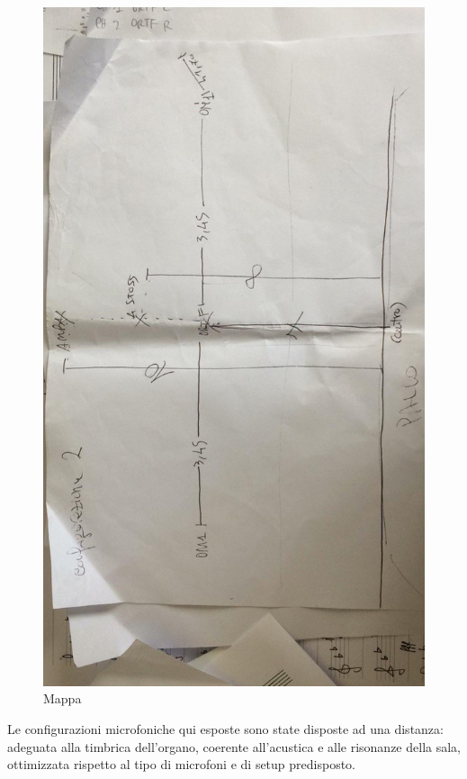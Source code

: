 \begin{figure}[th!]
\begin{center}
\includegraphics[angle=270,width=.97\textwidth]{img/img0.jpeg}
\caption{Mappa}
\label{mappa}
\end{center}
\end{figure}

Le configurazioni microfoniche qui esposte sono state disposte ad una 
distanza: adeguata alla timbrica dell'organo, coerente all'acustica e alle 
risonanze della sala, ottimizzata rispetto al tipo di microfoni e di setup 
predisposto.




